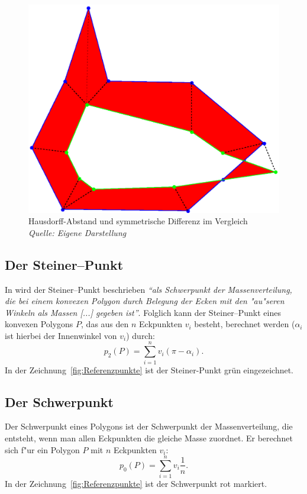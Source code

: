 \begin{figure}
	\centering
	\includegraphics[scale=.6]{Metrikengestoert.eps}
	\caption[Vergleich von Hausdorff--Abstand und symmetrischer Differenz]{Hausdorff-Abstand und symmetrische Differenz im Vergleich\\\textit{Quelle: Eigene Darstellung}}
	\label{fig:VergleichMetrik}
\end{figure}


\subsection{Der Steiner--Punkt}\label{Steinerpunkt}

In \cite{Sch} wird der Steiner--Punkt beschrieben \textit{"`als Schwerpunkt der Massenverteilung, die bei einem konvexen Polygon durch Belegung der Ecken mit den "au"seren Winkeln als Massen [...] gegeben ist"'}. Folglich kann der Steiner--Punkt eines konvexen Polygons $P$, das aus den $n$ Eckpunkten $v_i$ besteht, berechnet werden ($\alpha_i$ ist hierbei der Innenwinkel von $v_i$) durch:
\[p_2(P)=\sum^n_{i=1}v_i (\pi-\alpha_i).\]
In der Zeichnung~\vref{fig:Referenzpunkte} ist der Steiner-Punkt grün eingezeichnet.


\subsection{Der Schwerpunkt}\label{Schwerp}

Der Schwerpunkt eines Polygons ist der Schwerpunkt der Massenverteilung, die entsteht, wenn man allen Eckpunkten die gleiche Masse zuordnet. Er berechnet sich f"ur ein Polygon $P$ mit $n$ Eckpunkten $v_i$:
\[p_0(P)=\sum^n_{i=1}v_i \frac{1}{n}.\]
In der Zeichnung~\vref{fig:Referenzpunkte} ist der Schwerpunkt rot markiert. 

